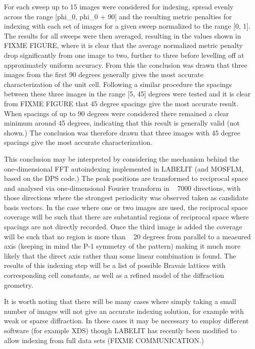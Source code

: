 \documentclass[a4paper, 11pt]{article}
\begin{document}
For each sweep up to 15 images were considered for indexing, spread evenly across the range [phi\_0, phi\_0 + 90] and the resulting metric penalties for indexing with each set of images for a given sweep normalized to the range [0, 1]. The results for all sweeps were then averaged, resulting in the values shown in FIXME FIGURE, where it is clear that the average normalized metric penalty drop significantly from one image to two, further to three before levelling off at approximately uniform accuracy. From this the conclusion was drawn that three images from the first 90 degrees generally gives the most accurate characterization of the unit cell. Following a similar procedure the spacings between these three images in the range [5, 45] degrees were tested and it is clear from FIXME FIGURE that 45 degree spacings give the most accurate result. When spacings of up to 90 degrees were considered there remained a clear minimum around 45 degrees, indicating that this result is generally valid (not shown.) The conclusion was therefore drawn that three images with 45 degree spacings give the most accurate characterization. 

This conclusion may be interpreted by considering the mechanism behind the one-dimensional FFT autoindexing implemented in LABELIT (and MOSFLM, based on the DPS code.) The peak positions are transformed to reciprocal space and analysed via one-dimensional Fourier transform in ~ 7000 directions, with those directions where the strongest periodicity was observed taken as candidate basis vectors. In the case where one or two images are used, the reciprocal space coverage will be such that there are substantial regions of reciprocal space where spacings are not directly recorded. Once the third image is added the coverage will be such that no region is more than ~ 20 degrees from parallel to a measured axis (keeping in mind the P-1 symmetry of the pattern) making it much more likely that the direct axis rather than some linear combination is found. The results of this indexing step will be a list of possible Bravais lattices with corresponding cell constants, as well as a refined model of the diffraction geometry.

It is worth noting that there will be many cases where simply taking a small number of images will not give an accurate indexing solution, for example with weak or sparse diffraction. In these cases it may be necessary to employ different software (for example XDS) though LABELIT has recently been modified to allow indexing from full data sets (FIXME COMMUNICATION.)
\end{document}
